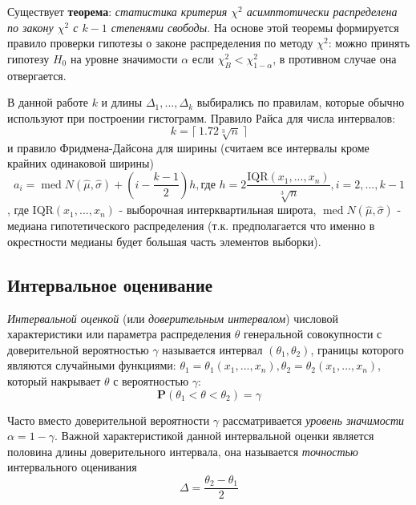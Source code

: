 \documentclass[12pt,a4paper]{article}
\DeclareMathOperator{\med}{med}
\begin{document}
Существует \textbf{теорема}: \textit{статистика критерия $\chi^2$ асимптотически распределена по закону $\chi^2$ с $k-1$ степенями свободы}. На основе этой теоремы формируется правило проверки гипотезы о законе распределения по методу $\chi^2$: можно принять гипотезу $H_0$ на уровне значимости $\alpha$ если $\chi^2_{B} < \chi^2_{1-\alpha}$, в противном случае она отвергается.

В данной работе $k$ и длины $\Delta_1, ..., \Delta_k$ выбирались по правилам, которые обычно используют при построении гистограмм\cite{histogram}. Правило Райса для числа интервалов:
\begin{equation}
k = \lceil \ 1.72\sqrt[3]{n} \ \rceil 
\end{equation}
и правило Фридмена-Дайсона для ширины (считаем все интервалы кроме крайних одинаковой ширины)
\begin{equation}
a_i = \med{N(\widehat{\mu}, \widehat{\sigma})} + \left(i - \frac{k-1}{2}\right) h, \text{где } h = 2 \frac{\text{IQR} (x_1, ..., x_n)}{\sqrt[3]{n}}, i = 2, ..., k-1
\end{equation}
, где $\text{IQR}(x_1, ..., x_n)$ - выборочная интерквартильная широта, $\med{N(\widehat{\mu}, \widehat{\sigma})}$ - медиана гипотетического распределения (т.к. предполагается что именно в окрестности медианы будет большая часть элементов выборки).

\subsection{Интервальное оценивание}
\textit{Интервальной оценкой} (или \textit{доверительным интервалом}) числовой характеристики или параметра распределения $\theta$ генеральной совокупности с доверительной вероятностью $\gamma$ называется интервал $(\theta_1, \theta_2)$, границы которого являются случайными функциями: $\theta_1 = \theta_1 (x_1, ..., x_n), \theta_2 = \theta_2 (x_1, ..., x_n)$, который накрывает $\theta$ с вероятностью $\gamma$:
\begin{equation}
\mathbf{P}(\theta_1 < \theta < \theta_2) = \gamma
\end{equation}

Часто вместо доверительной вероятности $\gamma$ рассматривается  \textit{уровень значимости} $\alpha = 1 - \gamma$. Важной характеристикой данной интервальной оценки является половина длины доверительного интервала, она называется \textit{точностью} интервального оценивания
\begin{equation}
\Delta = \frac{\theta_2 - \theta_1}{2}
\end{equation}
\end{document}
